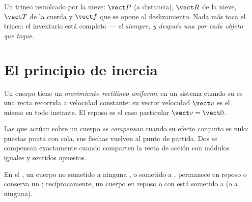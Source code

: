 \begin{example}\label{ex:g10:inertia:sled}
Un trineo remolcado por la nieve:  $\vect P$ (a distancia),  $\vect R$ de la nieve,  $\vect T$ de la cuerda y
 $\vect f$ que se opone al deslizamiento. Nada más toca el
trineo: el inventario está completo --- \emph{el  siempre, y
después una  por cada objeto que toque}.
\end{example}

\section{El principio de inercia}

\begin{definition}\label{def:g10:inertia:uniform}
Un cuerpo tiene un \emph{movimiento rectilíneo
uniforme} en un sistema cuando su
 es una recta recorrida a velocidad constante: su vector
velocidad $\vect v$ es el mismo en todo instante. El reposo es el caso
particular $\vect v = \vect 0$.
\end{definition}

\begin{definition}\label{def:g10:inertia:compensate}
Las  que actúan sobre un cuerpo \emph{se
compensan} cuando su efecto conjunto es
nulo: puestas punta con cola, sus flechas vuelven al punto de partida.
Dos  se compensan exactamente cuando comparten la recta de acción
con módulos iguales y sentidos opuestos.
\end{definition}

\begin{theorem}\label{thm:g10:inertia:principle}
En el , un cuerpo no sometido a ninguna , o
sometido a , permanece en reposo o conserva un
; recíprocamente, un cuerpo en reposo o
con  está sometido a  (o a ninguna).
\end{theorem}
\admitted

